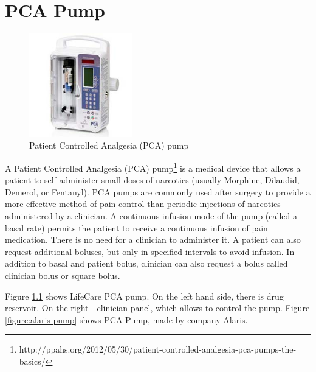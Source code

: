 
\cleardoublepage


\chapter{PCA Pump}
\label{pcapump}


\begin{figure}
  \begin{center}
    \includegraphics[width=0.4\textwidth]{figures/pca-pump.png}
  \end{center}
  \caption{Patient Controlled Analgesia (PCA) pump}
  \label{figure:pca-pump}
\end{figure}

A Patient Controlled Analgesia (PCA) pump\footnote{http://ppahs.org/2012/05/30/patient-controlled-analgesia-pca-pumps-the-basics/} is a medical device that allows a patient to self-administer small doses of narcotics (usually Morphine, Dilaudid, Demerol, or Fentanyl). PCA pumps are commonly used after surgery to provide a more effective method of pain control than periodic injections of narcotics administered by a clinician. A continuous infusion mode of the pump (called a basal rate) permits the patient to receive a continuous infusion of pain medication. There is no need for a clinician to administer it. A patient can also request additional boluses, but only in specified intervals to avoid infusion. In addition to basal and patient bolus, clinician can also request a bolus called clinician bolus or square bolus. 

Figure \ref{figure:pca-pump} shows LifeCare PCA pump. On the left hand side, there is drug reservoir. On the right -  clinician panel, which allows to control the pump. Figure \ref{figure:alaris-pump} shows PCA Pump, made by company Alaris. 

